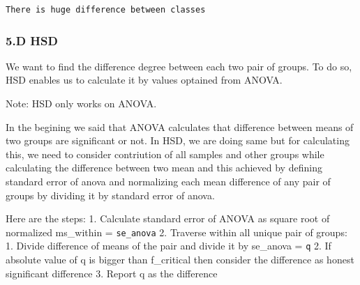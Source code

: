 \documentclass[11pt]{article}
\begin{document}
    \begin{Verbatim}[commandchars=\\\{\}]
There is huge difference between classes

    \end{Verbatim}

    \hypertarget{d-hsd}{%
\subsubsection{5.D HSD}\label{d-hsd}}

We want to find the difference degree between each two pair of groups.
To do so, HSD enables us to calculate it by values optained from ANOVA.

Note: HSD only works on ANOVA.

In the begining we said that ANOVA calculates that difference between
means of two groups are significant or not. In HSD, we are doing same
but for calculating this, we need to consider contriution of all samples
and other groups while calculating the difference between two mean and
this achieved by defining standard error of anova and normalizing each
mean difference of any pair of groups by dividing it by standard error
of anova.

Here are the steps: 1. Calculate standard error of ANOVA as square root
of normalized ms\_within = \texttt{se\_anova} 2. Traverse within all
unique pair of groups: 1. Divide difference of means of the pair and
divide it by se\_anova = \texttt{q} 2. If absolute value of q is bigger
than f\_critical then consider the difference as honest significant
difference 3. Report q as the difference
\end{document}
